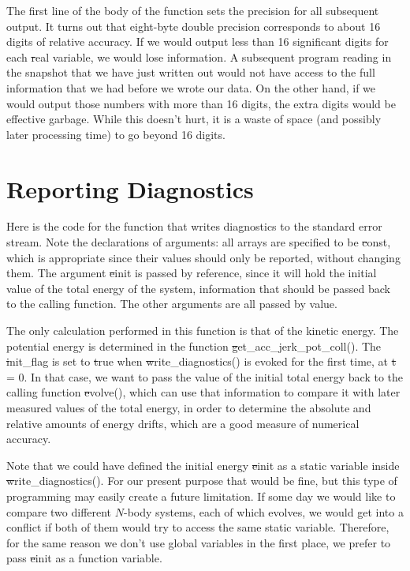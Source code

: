 The first line of the body of the function sets the precision for all
subsequent output.  It turns out that eight-byte double precision
corresponds to about 16 digits of relative accuracy.  If we would
output less than 16 significant digits for each {\st real} variable, 
we would lose information.  A subsequent program reading in the
snapshot that we have just written out would not have access to the
full information that we had before we wrote our data.  On the other
hand, if we would output those numbers with more than 16 digits, the
extra digits would be effective garbage.  While this doesn't hurt, it
is a waste of space (and possibly later processing time) to go beyond
16 digits.

\section{Reporting Diagnostics}

Here is the code for the function that writes diagnostics to the
standard error stream.  Note the declarations of arguments: all arrays
are specified to be {\st const}, which is appropriate since their
values should only be reported, without changing them.  The argument
{\st einit} is passed by reference, since it will hold the initial
value of the total energy of the system, information that should be
passed back to the calling function.  The other arguments are all
passed by value.


The only calculation performed in this function is that of the kinetic
energy.  The potential energy is determined in the function {\st
get\_acc\_jerk\_pot\_coll()}.  The {\st init\_flag} is set to {\st
true} when {\st write\_diagnostics()} is evoked for the first time, at
{\st t = 0}.  In that case, we want to pass the value of the initial
total energy back to the calling function {\st evolve()}, which can
use that information to compare it with later measured values of the
total energy, in order to determine the absolute and relative amounts
of energy drifts, which are a good measure of numerical accuracy.

Note that we could have defined the initial energy {\st einit} as a
static variable inside {\st write\_diagnostics()}.  For our present
purpose that would be fine, but this type of programming may easily
create a future limitation.  If some day we would like to compare two
different $N$-body systems, each of which evolves, we would get into a
conflict if both of them would try to access the same static variable.
Therefore, for the same reason we don't use global variables in the
first place, we prefer to pass {\st einit} as a function variable.

